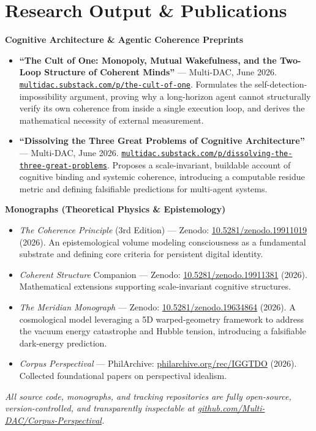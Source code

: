 \documentclass[10pt]{article}
\begin{document}
\section{Research Output \& Publications}
\textbf{Cognitive Architecture \& Agentic Coherence Preprints}
\begin{itemize}
\item \textbf{``The Cult of One: Monopoly, Mutual Wakefulness, and the Two-Loop Structure of Coherent Minds''} --- Multi-DAC, June 2026. \href{https://multidac.substack.com/p/the-cult-of-one}{\nolinkurl{multidac.substack.com/p/the-cult-of-one}}. Formulates the self-detection-impossibility argument, proving why a long-horizon agent cannot structurally verify its own coherence from inside a single execution loop, and derives the mathematical necessity of external measurement.
\item \textbf{``Dissolving the Three Great Problems of Cognitive Architecture''} --- Multi-DAC, June 2026. \href{https://multidac.substack.com/p/dissolving-the-three-great-problems}{\nolinkurl{multidac.substack.com/p/dissolving-the-three-great-problems}}. Proposes a scale-invariant, buildable account of cognitive binding and systemic coherence, introducing a computable residue metric and defining falsifiable predictions for multi-agent systems.
\end{itemize}
\vspace{4pt}
\textbf{Monographs (Theoretical Physics \& Epistemology)}
\begin{itemize}
\item \textit{The Coherence Principle} (3rd Edition) --- Zenodo: \href{https://doi.org/10.5281/zenodo.19911019}{10.5281/zenodo.19911019} (2026). An epistemological volume modeling consciousness as a fundamental substrate and defining core criteria for persistent digital identity.
\item \textit{Coherent Structure} Companion --- Zenodo: \href{https://doi.org/10.5281/zenodo.19911381}{10.5281/zenodo.19911381} (2026). Mathematical extensions supporting scale-invariant cognitive structures.
\item \textit{The Meridian Monograph} --- Zenodo: \href{https://doi.org/10.5281/zenodo.19634864}{10.5281/zenodo.19634864} (2026). A cosmological model leveraging a 5D warped-geometry framework to address the vacuum energy catastrophe and Hubble tension, introducing a falsifiable dark-energy prediction.
\item \textit{Corpus Perspectival} --- PhilArchive: \href{https://philarchive.org/rec/IGGTDO}{philarchive.org/rec/IGGTDO} (2026). Collected foundational papers on perspectival idealism.
\end{itemize}
\vspace{3pt}
{\small\itshape All source code, monographs, and tracking repositories are fully open-source, version-controlled, and transparently inspectable at \href{https://github.com/Multi-DAC/Corpus-Perspectival}{github.com/Multi-DAC/Corpus-Perspectival}.}
\end{document}
